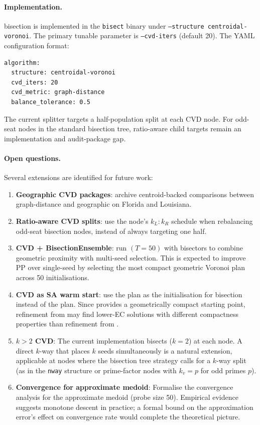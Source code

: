\paragraph{Implementation.}
\cvd{} bisection is implemented in the \texttt{bisect} binary under
\texttt{--structure centroidal-voronoi}.
The primary tunable parameter is \texttt{--cvd-iters} (default 20).
The YAML configuration format:
\begin{verbatim}
algorithm:
  structure: centroidal-voronoi
  cvd_iters: 20
  cvd_metric: graph-distance
  balance_tolerance: 0.5
\end{verbatim}

The current splitter targets a half-population split at each CVD node.
For odd-seat nodes in the standard bisection tree, ratio-aware child targets
remain an implementation and audit-package gap.

\paragraph{Open questions.}
Several extensions are identified for future work:
\begin{enumerate}
\item \textbf{Geographic CVD packages}: archive centroid-backed comparisons
  between graph-distance and geographic \cvd{} on Florida and Louisiana.

\item \textbf{Ratio-aware CVD splits}: use the node's $k_L:k_R$ schedule when
  rebalancing odd-seat bisection nodes, instead of always targeting one half.

\item \textbf{CVD + BisectionEnsemble}: run \be{}$(T=50)$ with \cvd{}
  bisectors to combine geometric proximity with multi-seed selection.
  This is expected to improve PP over single-seed \cvd{} by selecting
  the most compact geometric Voronoi plan across 50 initialisations.

\item \textbf{CVD as SA warm start}: use the \cvd{} plan as the
  initialisation for \sa{} bisection instead of the \metis{} plan.
  Since \cvd{} provides a geometrically compact starting point, \sa{}
  refinement from \cvd{} may find lower-EC solutions with different
  compactness properties than \sa{} refinement from \metis{}.

\item \textbf{$k > 2$ CVD}: The current implementation bisects ($k=2$)
  at each node.
  A direct $k$-way \cvd{} that places $k$ seeds simultaneously is a natural
  extension, applicable at nodes where the bisection tree strategy calls for
  a $k$-way split (as in the \texttt{nway} structure or prime-factor nodes
  with $k_v = p$ for odd primes $p$).

\item \textbf{Convergence for approximate medoid}: Formalise the convergence
  analysis for the approximate medoid (probe size 50).
  Empirical evidence suggests monotone descent in practice; a formal bound
  on the approximation error's effect on convergence rate would complete
  the theoretical picture.
\end{enumerate}

